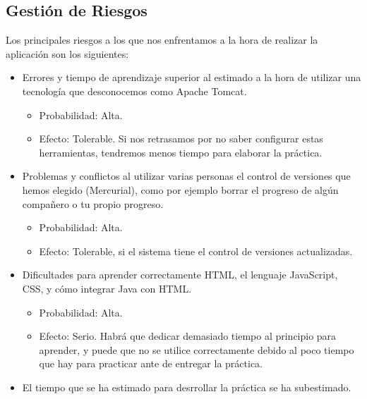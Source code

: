 \subsection{Gestión de Riesgos}
Los principales riesgos a los que nos enfrentamos a la hora de realizar la aplicación son los siguientes:
\begin{itemize}
\item Errores y tiempo de aprendizaje superior al estimado a la hora de utilizar una tecnología que desconocemos como Apache Tomcat.

\begin{itemize}
\item Probabilidad: Alta.

\item Efecto: Tolerable. Si nos retrasamos por no saber configurar estas herramientas, tendremos menos tiempo para elaborar la práctica.

\end{itemize}

\item Problemas y conflictos al utilizar varias personas el control de versiones que hemos elegido (Mercurial), como por ejemplo borrar el progreso de algún compañero o tu propio progreso.

\begin{itemize}
\item Probabilidad: Alta.

\item Efecto: Tolerable, si el sistema tiene el control de versiones actualizadas.

\end{itemize}


\item Dificultades para aprender correctamente HTML,  el lenguaje JavaScript, CSS, y cómo integrar Java con HTML.

\begin{itemize}
\item Probabilidad: Alta.

\item Efecto: Serio. Habrá que dedicar demasiado tiempo al principio para aprender, y puede que no se utilice correctamente debido al poco tiempo que hay para practicar ante de entregar la práctica.

\end{itemize}


\item El tiempo que se ha estimado para desrrollar la práctica se ha subestimado.


\end{itemize}
